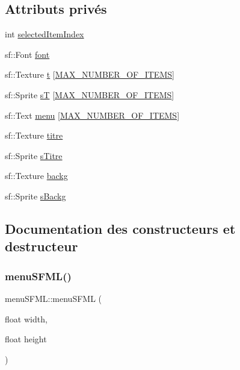 \subsection*{Attributs privés}
\begin{DoxyCompactItemize}
\item 
int \hyperlink{classmenu_s_f_m_l_aac4867daa4680dd0b9e8c74bcd3a10e3}{selected\+Item\+Index}
\item 
sf\+::\+Font \hyperlink{classmenu_s_f_m_l_a20b48948ce4135d1754b5ab7e9797850}{font}
\item 
sf\+::\+Texture \hyperlink{classmenu_s_f_m_l_ac268697287b7dc41dcae13b91193c6cf}{t} \mbox{[}\hyperlink{_menu_s_f_m_l_8h_a34e819be6bb222b369578bb037bb3564}{M\+A\+X\+\_\+\+N\+U\+M\+B\+E\+R\+\_\+\+O\+F\+\_\+\+I\+T\+E\+MS}\mbox{]}
\item 
sf\+::\+Sprite \hyperlink{classmenu_s_f_m_l_a3b5438045fb71c169b836c8071d4901b}{sT} \mbox{[}\hyperlink{_menu_s_f_m_l_8h_a34e819be6bb222b369578bb037bb3564}{M\+A\+X\+\_\+\+N\+U\+M\+B\+E\+R\+\_\+\+O\+F\+\_\+\+I\+T\+E\+MS}\mbox{]}
\item 
sf\+::\+Text \hyperlink{classmenu_s_f_m_l_a92f06499c14f23091d939964d115aa64}{menu} \mbox{[}\hyperlink{_menu_s_f_m_l_8h_a34e819be6bb222b369578bb037bb3564}{M\+A\+X\+\_\+\+N\+U\+M\+B\+E\+R\+\_\+\+O\+F\+\_\+\+I\+T\+E\+MS}\mbox{]}
\item 
sf\+::\+Texture \hyperlink{classmenu_s_f_m_l_ac26db2cb3d350a4a9bf501efccaa133e}{titre}
\item 
sf\+::\+Sprite \hyperlink{classmenu_s_f_m_l_ad5b55373042af434e3db87a383f88ffe}{s\+Titre}
\item 
sf\+::\+Texture \hyperlink{classmenu_s_f_m_l_a6570345f932592d09ca394d8bdd818bd}{backg}
\item 
sf\+::\+Sprite \hyperlink{classmenu_s_f_m_l_a0b61d070a7d1f2da7eea0686db7d5e98}{s\+Backg}
\end{DoxyCompactItemize}


\subsection{Documentation des constructeurs et destructeur}
\mbox{\label{classmenu_s_f_m_l_a046b036ce16166e648d6e0fd1e570309}} 
\subsubsection{\texorpdfstring{menu\+S\+F\+M\+L()}{menuSFML()}}
{\footnotesize\ttfamily menu\+S\+F\+M\+L\+::menu\+S\+F\+ML (\begin{DoxyParamCaption}\item[{float}]{width,  }\item[{float}]{height }\end{DoxyParamCaption})}

